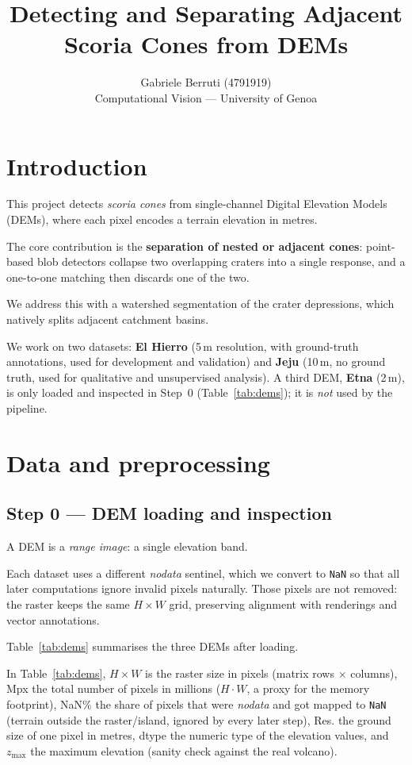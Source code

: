 \documentclass[11pt]{article}
\title{Detecting and Separating Adjacent Scoria Cones from DEMs}
\author{Gabriele Berruti (4791919)\\Computational Vision --- University of Genoa}
\date{}
\begin{document}
\maketitle

\section{Introduction}
This project detects \emph{scoria cones} from single-channel Digital Elevation
Models (DEMs), where each pixel encodes a terrain elevation in metres.

The core contribution is the \textbf{separation of nested or adjacent cones}:
point-based blob detectors collapse two overlapping craters into a single
response, and a one-to-one matching then discards one of the two.

We address this with a watershed segmentation of the crater depressions, which
natively splits adjacent catchment basins.

We work on two datasets: \textbf{El Hierro} (5\,m resolution, with ground-truth
annotations, used for development and validation) and \textbf{Jeju} (10\,m, no
ground truth, used for qualitative and unsupervised analysis). A third DEM,
\textbf{Etna} (2\,m), is only loaded and inspected in Step~0 (Table~\ref{tab:dems});
it is \emph{not} used by the pipeline.

\section{Data and preprocessing}

\subsection{Step 0 --- DEM loading and inspection}
A DEM is a \emph{range image}: a single elevation band.

Each dataset uses a different \emph{nodata} sentinel, which we convert to
\texttt{NaN} so that all later computations ignore invalid pixels naturally.
Those pixels are not removed: the raster keeps the same $H\times W$ grid, preserving
alignment with renderings and vector annotations.

Table~\ref{tab:dems} summarises the three DEMs after loading.

In Table~\ref{tab:dems}, $H\times W$ is the raster size in pixels (matrix rows
$\times$ columns), Mpx the total number of pixels in millions ($H\cdot W$, a proxy
for the memory footprint), NaN\% the share of pixels that were \emph{nodata} and
got mapped to \texttt{NaN} (terrain outside the raster/island, ignored by every
later step), Res. the ground size of one pixel in metres, dtype the numeric type of
the elevation values, and $z_{\max}$ the maximum elevation (sanity check against the
real volcano).
\end{document}
